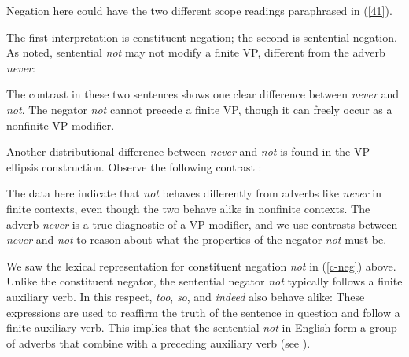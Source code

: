 \documentclass[output=paper
                ,modfonts
                		,nonflat
	        ,collection
	        ,collectionchapter
	        ,collectiontoclongg
 	        ,biblatex
                ,babelshorthands
                ,newtxmath
                ,draftmode
                ,colorlinks, citecolor=brown
]{./langsci/langscibook}
\begin{document}
{\begin{exe}
\begin{xlist}
\begin{exe}
\begin{xlist}
\z
%
Negation here could have the two different scope readings
paraphrased in (\ref{41}).


\eal\label{41}
\zl
%
The first interpretation is constituent negation; the second is
sentential negation. As noted, sentential \textit{not} may not modify a finite
VP, different from the adverb \textit{never}:



\eal
{}
\zl
%
The contrast in these two sentences
shows one clear difference between \textit{never}
and \textit{not}. The negator \textit{not} cannot
precede a finite VP, though it can freely occur
as a nonfinite VP modifier.
%
%
%
%

Another distributional difference between \textit{never} and \textit{not} is found in
the VP ellipsis construction.  Observe the following
contrast \citep{KS:02}:

\eal
\label{vpe-not-ex}
\zl
%
\noindent The data here indicate that \textit{not} behaves differently from
adverbs like \textit{never} in finite contexts, even though the two
behave alike in nonfinite contexts. The adverb \textit{never} is a true
diagnostic of a VP-modifier, and we use contrasts between \textit{never} and \textit{not} to reason about what the properties of
the negator \textit{not} must be.


We saw the lexical representation for constituent negation
\textit{not} in (\ref{c-neg}) above. Unlike the
constituent negator, the sentential negator \textit{not} typically
 follows a finite auxiliary verb. In this respect,
   \textit{too}, \textit{so}, and \textit{indeed} also behave alike:
\eal
{}
\zl
%
These expressions are used to
reaffirm the truth of the sentence in question and
follow a finite auxiliary verb.  This implies
that the sentential {\it not} in English
form a group of adverbs that combine with a
preceding auxiliary verb (see \citealt{Kim:00}).


\end{xlist}
\end{exe}
\end{xlist}
\end{exe}}
\end{document}
